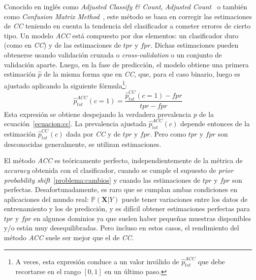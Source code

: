 Conocido en inglés como {\it Adjusted Classify \& Count}, {\it Adjusted
Count\/}~\cite{forman2008quantifying} o también como {\it Confusion Matrix
Method\/}~\cite{saerens2002adjusting}, este método se basa en corregir las
estimaciones de {\it CC\/} teniendo en cuenta la tendencia del clasificador a
cometer errores de cierto tipo. Un modelo {\it ACC\/} está compuesto por dos
elementos: un clasificador duro (como en {\it CC\/}) y de las estimaciones de
$tpr$ y $fpr$. Dichas estimaciones pueden obtenerse usando validación cruzada o
{\it cross-validation\/} o un conjunto de validación aparte. Luego, en la fase
de predicción, el modelo obtiene una primera estimación $\hat p$ de la misma
forma que en {\it CC}, que, para el caso binario, luego es ajustado aplicando la
siguiente fórmula\footnote{A veces, esta expresión conduce a un valor inválido
de $\hat p^{ACC}_{tst}$ que debe recortarse en el rango $[0, 1]$ en un último
paso.}:
\begin{equation}
    \hat p^{ACC}_{tst}(c=1) = \frac{\hat p^{CC}_{tst}(c=1)-fpr}{tpr-fpr}\label{ecuacion:acc_binaria}
\end{equation}
Esta expresión se obtiene despejando la verdadera prevalencia $p$ de la
ecuación~\ref{ecuacion:cc}. La prevalencia ajustada $\hat p^{ACC}_{tst}(c)$
depende entonces de la estimación $\hat p^{CC}_{tst}(c)$ dada por {\it CC\/} y
de $tpr$ y $fpr$. Pero como $tpr$ y $fpr$ son desconocidas generalmente, se
utilizan estimaciones.

El método {\it ACC\/} es teóricamente perfecto, independientemente de la métrica
de {\it accuracy\/} obtenida con el clasificador, cuando se cumple el supuesto
de {\it prior probability shift\/}~\ref{problema:cambios} y cuando las
estimaciones de $tpr$ y $fpr$ son perfectas. Desafortunadamente, es raro que se
cumplan ambas condiciones en aplicaciones del mundo real:
$\mathbb{P}(\boldsymbol{X}|Y)$ puede tener variaciones entre los datos de
entrenamiento y los de predicción, y es difícil obtener estimaciones perfectas
para $tpr$ y $fpr$ en algunos dominios ya que suelen haber pequeñas muestras
disponibles y/o están muy desequilibradas. Pero incluso en estos casos, el
rendimiento del método {\it ACC\/} suele ser mejor que el de {\it CC}.

